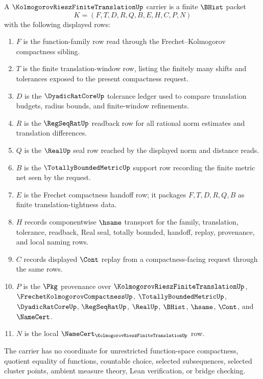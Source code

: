 \begin{definition}
\label{def:kolmogorov-riesz-finite-translation-carrier}
A $\KolmogorovRieszFiniteTranslationUp$ carrier is a finite $\BHist$ packet
$$
K=(F,T,D,R,Q,B,E,H,C,P,N)
$$
with the following displayed rows:
\begin{enumerate}
\item $F$ is the function-family row read through the Frechet--Kolmogorov compactness sibling.
\item $T$ is the finite translation-window row, listing the finitely many shifts and tolerances exposed to the present compactness request.
\item $D$ is the $\DyadicRatCoreUp$ tolerance ledger used to compare translation budgets, radius bounds, and finite-window refinements.
\item $R$ is the $\RegSeqRatUp$ readback row for all rational norm estimates and translation differences.
\item $Q$ is the $\RealUp$ seal row reached by the displayed norm and distance reads.
\item $B$ is the $\TotallyBoundedMetricUp$ support row recording the finite metric net seen by the request.
\item $E$ is the Frechet compactness handoff row; it packages $F,T,D,R,Q,B$ as finite translation-tightness data.
\item $H$ records componentwise $\hsame$ transport for the family, translation, tolerance, readback, Real seal, totally bounded, handoff, replay, provenance, and local naming rows.
\item $C$ records displayed $\Cont$ replay from a compactness-facing request through the same rows.
\item $P$ is the $\Pkg$ provenance over $\KolmogorovRieszFiniteTranslationUp$, $\FrechetKolmogorovCompactnessUp$, $\TotallyBoundedMetricUp$, $\DyadicRatCoreUp$, $\RegSeqRatUp$, $\RealUp$, $\BHist$, $\hsame$, $\Cont$, and $\NameCert$.
\item $N$ is the local $\NameCert_{\KolmogorovRieszFiniteTranslationUp}$ row.
\end{enumerate}
The carrier has no coordinate for unrestricted function-space compactness, quotient equality of functions, countable choice, selected subsequences, selected cluster points, ambient measure theory, Lean verification, or bridge checking.
\end{definition}

